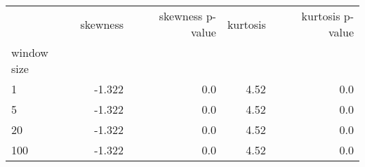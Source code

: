 \begin{tabular}{lrrrr}
\toprule
{} &  skewness &  skewness p-value &  kurtosis &  kurtosis p-value \\
window size &           &                   &           &                   \\
\midrule
1           &    -1.322 &               0.0 &      4.52 &               0.0 \\
5           &    -1.322 &               0.0 &      4.52 &               0.0 \\
20          &    -1.322 &               0.0 &      4.52 &               0.0 \\
100         &    -1.322 &               0.0 &      4.52 &               0.0 \\
\bottomrule
\end{tabular}
